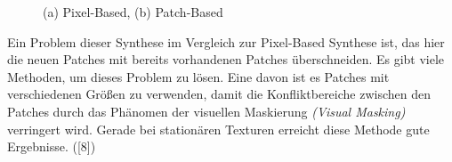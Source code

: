 \documentclass[12pt]{report}
\begin{document}
\begin{figure}[H]
    \centering
    \qquad
    \caption{(a) Pixel-Based, (b) Patch-Based}%
\end{figure}

Ein Problem dieser Synthese im Vergleich zur Pixel-Based Synthese ist, das hier die neuen Patches mit bereits vorhandenen Patches überschneiden.
Es gibt viele Methoden, um dieses Problem zu lösen.
Eine davon ist es Patches mit verschiedenen Größen zu verwenden, damit die Konfliktbereiche zwischen den Patches durch das Phänomen der visuellen Maskierung
\textit{(Visual Masking)} verringert wird.
Gerade bei stationären Texturen erreicht diese Methode gute Ergebnisse. {([8])}
\end{document}
